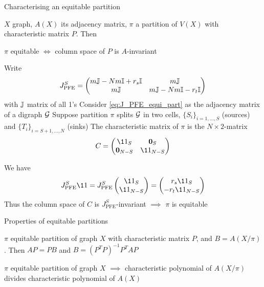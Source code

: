 \documentclass[aspectratio=169]{beamer}
\begin{document}
\begin{frame}{Characterising an equitable partition}
\begin{lemma}
	$X$ graph, $A(X)$ its adjacency matrix, $\pi$ a partition of $V(X)$ with characteristic matrix $P$. Then
	\begin{center}
		$\pi$ equitable $\iff$ column space of $P$ is $A$-invariant
	\end{center}
\end{lemma}
\end{frame}

\begin{frame}
	Write
	\begin{equation}\label{eq:J_PFE_equi_part}
	J_{\textrm{PFE}}^S = \begin{pmatrix}
		m\mathbb{J} - Nm\mathbb{I} + r_s\mathbb{I} & m \mathbb{J} \\
		m\mathbb{J} & m\mathbb{J} - Nm\mathbb{I} - r_t\mathbb{I}
	\end{pmatrix}
	\end{equation}
	with $\mathbb{J}$ matrix of all 1's
	\vfill
	Consider \eqref{eq:J_PFE_equi_part} as the adjacency matrix of a digraph $\mathcal{G}$
	\vfill
	Suppose partition $\pi$ splits $\mathcal{G}$ in two cells, $\{S_i\}_{i=1,\ldots,S}$ (sources) and $\{T_i\}_{i=S+1,\ldots,N}$ (sinks)
	\vfill
	The characteristic matrix of $\pi$ is the $N\times 2$-matrix
	\[
		C = 
		\begin{pmatrix}
		\11_S & \b0_S \\
		\b0_{N-S} & \11_{N-S}
		\end{pmatrix}
	\]
\end{frame}

\begin{frame}
	We have
	\[
		J_{\textrm{PFE}}^S \11 = 
		J_{\textrm{PFE}}^S\begin{pmatrix}
		\11_S\\ \11_{N-S}
		\end{pmatrix}=
		\begin{pmatrix}
		r_s \11_S \\
		-r_t \11_{N-S}
		\end{pmatrix}
	\]
	\vfill
	Thus the column space of $C$ is $J_{\textrm{PFE}}^S$-invariant $\implies$ $\pi$ is equitable
\end{frame}

\begin{frame}{Properties of equitable partitions}
\begin{lemma}
	$\pi$ equitable partition of graph $X$ with characteristic matrix $P$, and $B=A(X/\pi)$. Then $AP = PB$ and
	$B=(P^TP)^{-1}P^T AP$
\end{lemma}
\vfill
\begin{theorem}
	$\pi$ equitable partition of graph $X$ $\implies$ characteristic polynomial of $A(X/\pi)$ divides characteristic polynomial of $A(X)$
\end{theorem}
\end{frame}
\end{document}
